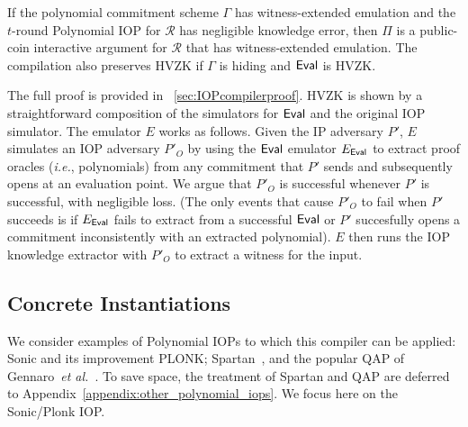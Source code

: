 \begin{theorem}\label{thm:IOPcompiler}
If the polynomial commitment scheme $\Gamma$ has witness-extended emulation and the $t$-round Polynomial IOP for $\mathcal{R}$ has negligible knowledge error, then $\Pi$ is a public-coin interactive argument for $\mathcal{R}$ that has witness-extended emulation. The compilation also preserves HVZK if $\Gamma$ is hiding and $\textsf{{Eval}}$ is HVZK. 
\end{theorem}

The full proof is provided in \appendixphrase~\ref{sec:IOPcompilerproof}. 
HVZK is shown by a straightforward composition of the simulators for $\textsf{{Eval}}$ and the original IOP simulator. The emulator $E$ works as follows. Given the IP adversary $P'$, $E$ simulates an IOP adversary $P'_O$ by using the $\textsf{{Eval}}$ emulator $E_\textsf{{Eval}}$ to extract proof oracles (\emph{i.e.}, polynomials) from any commitment that $P'$ sends and subsequently opens at an evaluation point. We argue that $P'_O$ is successful whenever $P'$ is successful, with negligible loss. (The only events that cause $P'_O$ to fail when $P'$ succeeds is if $E_\textsf{{Eval}}$ fails to extract from a successful $\textsf{{Eval}}$ or $P'$ succesfully opens a commitment inconsistently with an extracted polynomial). $E$ then runs the IOP knowledge extractor with $P'_O$ to extract a witness for the input. 


\subsection{Concrete Instantiations} 
We consider examples of Polynomial IOPs to which this compiler can be applied: \textsf{Sonic} and its improvement \textsf{PLONK}; \textsf{Spartan}~\cite{Spartan}, and the popular QAP of Gennaro~\emph{et al.}~\cite{EC:GGPR13}. 
\ifappendix
To save space, the treatment of \textsf{Spartan} and QAP are deferred to Appendix~\ref{appendix:other_polynomial_iops}. We focus here on the \textsf{Sonic}/\textsf{Plonk} IOP.
\fi

